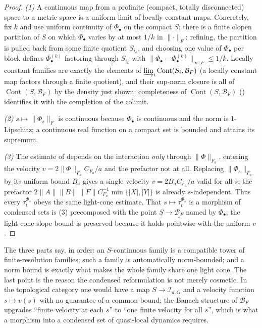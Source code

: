 \documentclass[12pt]{article}
\newcommand{\cond}[1]{\underline{#1}}          %
\newcommand{\Cont}{\operatorname{Cont}}        %
\newcommand{\Int}{\mathcal{I}}                 %
\newcommand{\Ffun}{F}                          %
\newcommand{\BF}{\mathcal{B}_{F}}              %
\newcommand{\norm}[1]{\lVert #1\rVert}
\newcommand{\Fnorm}[1]{\lVert #1\rVert_{F}}
\newcommand{\Fanorm}[1]{\lVert #1\rVert_{F_a}}
\theoremstyle{definition}
\theoremstyle{remark}
\begin{document}
\begin{proof}
\emph{(1)} A continuous map from a profinite (compact, totally disconnected) space to a metric
space is a uniform limit of locally constant maps. Concretely, fix $k$ and use uniform
continuity of $\Phi_\bullet$ on the compact $S$: there is a finite clopen partition of $S$ on
which $\Phi_\bullet$ varies by at most $1/k$ in $\Fnorm{\cdot}$; refining, the partition is
pulled back from some finite quotient $S_{i_k}$, and choosing one value of $\Phi_\bullet$ per
block defines $\Phi^{(k)}_\bullet$ factoring through $S_{i_k}$ with
$\norm{\Phi_\bullet-\Phi^{(k)}_\bullet}_{\infty,\Ffun}\le 1/k$. Locally constant families are
exactly the elements of $\varinjlim_i\Cont(S_i,\BF)$ (a locally constant map factors through a
finite quotient), and their sup-norm closure is all of $\Cont(S,\BF)$ by the density just
shown; completeness of $\Cont(S,\BF)$ () identifies it with the
completion of the colimit.

\emph{(2)} $s\mapsto\Fnorm{\Phi_s}$ is continuous because $\Phi_\bullet$ is continuous and the
norm is $1$-Lipschitz; a continuous real function on a compact set is bounded and attains its
supremum.

\emph{(3)} The estimate of  depends on the interaction \emph{only} through
$\Fanorm{\Phi}$, entering the velocity $v=2\Fanorm{\Phi}C_{\Ffun_a}/a$ and the prefactor not at
all. Replacing $\Fanorm{\Phi_s}$ by its uniform bound $B_a$ gives a single velocity
$v=2B_aC_{\Ffun_a}/a$ valid for all $s$; the prefactor $2\norm{A}\norm{B}\norm{\Ffun}
C_{\Ffun_a}^{-1}\min\{\lvert X\rvert,\lvert Y\rvert\}$ is already $s$-independent. Thus every
$\tau^{\Phi_s}_t$ obeys the same light-cone estimate. That $s\mapsto\tau^{\Phi_s}_t$ is a
morphism of condensed sets is (3) precomposed with the point
$\cond{S}\to\cond{\BF}$ named by $\Phi_\bullet$; the light-cone slope bound is preserved
because it holds pointwise with the uniform $v$.
\end{proof}

The three parts say, in order: an $S$-continuous family is a compatible tower of
finite-resolution families; such a family is automatically norm-bounded; and a norm bound is
exactly what makes the whole family share one light cone. The last point is the reason the
condensed reformulation is not merely cosmetic. In the topological category one would have a
map $S\to\Int_{d,G}$ and a velocity function $s\mapsto v(s)$ with no guarantee of a common
bound; the Banach structure of $\BF$ upgrades ``finite velocity at each $s$'' to ``one finite
velocity for all $s$'', which is what a morphism into a condensed set of quasi-local dynamics
requires.
\end{document}
